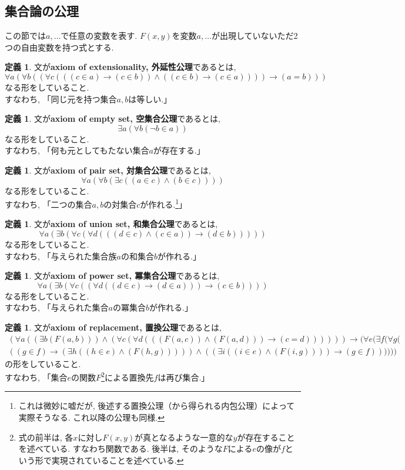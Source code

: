 \documentclass[a4paper]{bxjsarticle}
\theoremstyle{definition}
\newtheorem{defn}[thm]{定義}
\begin{document}
    \subsection{集合論の公理}
        この節では$a, \dots$で任意の変数を表す. $F(x,y)$を変数$a, \dots$が出現していないただ2つの自由変数を持つ式とする.
        \begin{defn}
        文が\textbf{axiom of extensionality, 外延性公理}であるとは,
        \[\forall a (\forall b ((\forall c (((c\in a)\to(c\in b))\land((c\in b)\to(c\in a)))) \to (a=b)))\]
        なる形をしていること.\\
        すなわち, 「同じ元を持つ集合$a, b$は等しい.」
        \end{defn}
        \begin{defn}
        文が\textbf{axiom of empty set, 空集合公理}であるとは,
        \[\exists a (\forall b (\lnot b \in a))\]
        なる形をしていること.\\
        すなわち, 「何も元としてもたない集合$a$が存在する.」
        \end{defn}
        \begin{defn}
        文が\textbf{axiom of pair set, 対集合公理}であるとは,
        \[\forall a (\forall b (\exists c ((a\in c)\land (b\in c))))\]
        なる形をしていること.\\
        すなわち, 「二つの集合$a, b$の対集合$c$が作れる.\footnote{これは微妙に嘘だが, 後述する置換公理（から得られる内包公理）によって実際そうなる. これ以降の公理も同様.}」
        \end{defn}
        \begin{defn}
        文が\textbf{axiom of union set, 和集合公理}であるとは,
        \[\forall a (\exists b (\forall c (\forall d (((d\in c) \land (c\in a)) \to (d\in b)))))\]
        なる形をしていること.\\
        すなわち, 「与えられた集合族$a$の和集合$b$が作れる.」
        \end{defn}
        \begin{defn}
        文が\textbf{axiom of power set, 冪集合公理}であるとは,
        \[\forall a (\exists b (\forall c ((\forall d ((d \in c) \to (d \in a))) \to (c \in b))))\]
        なる形をしていること.\\
        すなわち, 「与えられた集合$a$の冪集合$b$が作れる.」
        \end{defn}
        \begin{defn}
        文が\textbf{axiom of replacement, 置換公理}であるとは,
        \begin{align*}
            (\forall a ((\exists b (F(a,b)))\land (\forall c (\forall d (((F(a,c))\land(F(a,d)))\to(c=d))))))\to(\forall e (\exists f (\forall g (    \\((g \in f)\to(\exists h ((h\in e)\land(F(h,g)))))\land((\exists i ((i\in e)\land(F(i,g))))\to(g\in f))        ))))
        \end{align*}
        の形をしていること.\\
        すなわち, 「集合$e$の関数$F$\footnote{式の前半は, 各$x$に対し$F(x,y)$が真となるような一意的な$y$が存在することを述べている. すなわち関数である. 後半は, そのような$F$による$e$の像が$f$という形で実現されていることを述べている.}による置換先$f$は再び集合.」
        \end{defn}
\end{document}
